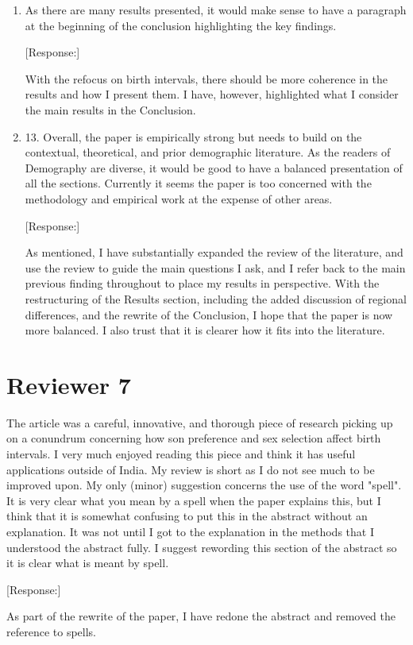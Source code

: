 \documentclass[letterpaper,12pt]{article}
\begin{document}
\begin{enumerate}
\item As there are many results presented, it would make sense to have a
paragraph at the beginning of the conclusion highlighting the key
findings.

[Response:]

With the refocus on birth intervals, there should be more coherence in the results and
how I present them.
I have, however, highlighted what I consider the main results in the Conclusion.



\item 13. Overall, the paper is empirically strong but needs to build on the
contextual, theoretical, and prior demographic literature. As the
readers of Demography are diverse, it would be good to have a balanced
presentation of all the sections. Currently it seems the paper is too
concerned with the methodology and empirical work at the expense of
other areas.

[Response:]

As mentioned, I have substantially expanded the review of the literature, and use the 
review to guide the main questions I ask, and I refer back to the main previous finding 
throughout to place my results in perspective.
With the restructuring of the Results section, including the added discussion of regional 
differences, and the rewrite of the Conclusion, I hope that the paper is now more 
balanced. 
I also trust that it is clearer how it fits into the literature.




\end{enumerate}

\newpage

\section*{Reviewer 7}

The article was a careful, innovative, and thorough piece of research
picking up on a conundrum concerning how son preference and sex
selection affect birth intervals. I very much enjoyed reading this piece
and think it has useful applications outside of India.  My review is
short as I do not see much to be improved upon.  My only (minor)
suggestion concerns the use of the word "spell".  It is very clear what
you mean by a spell when the paper explains this, but I think that it is
somewhat confusing to put this in the abstract without an explanation. 
It was not until I got to the explanation in the methods that I
understood the abstract fully.  I suggest rewording this section of the
abstract so it is clear what is meant by spell.

[Response:]

As part of the rewrite of the paper, I have redone the abstract and removed the
reference to spells.


\newpage


\end{document}
